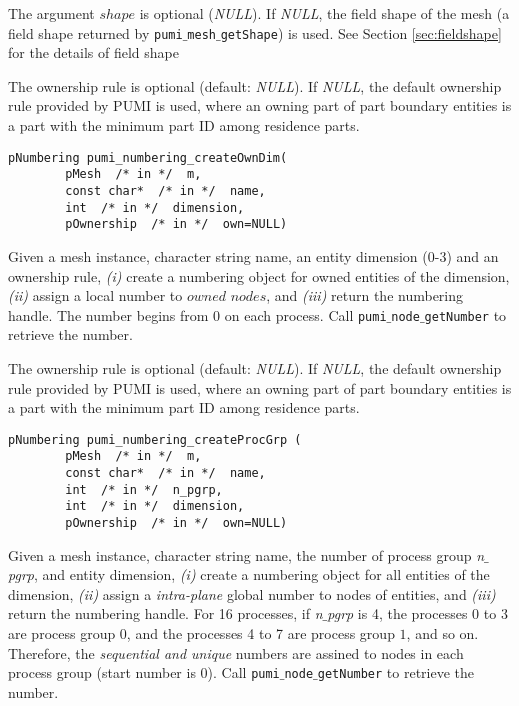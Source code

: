 The argument $shape$ is optional (\emph{NULL}). If \emph{NULL}, the field shape of the mesh 
(a field shape returned by \texttt{pumi$\_$mesh$\_$getShape}) is used. See Section \ref{sec:fieldshape} for the details of field shape

The ownership rule is optional (default: \emph{NULL}). If \emph{NULL}, the default ownership rule provided by PUMI is used, where an owning part of part boundary entities is a part with the minimum part ID among residence parts.

\begin{verbatim}
pNumbering pumi_numbering_createOwnDim(
        pMesh  /* in */  m,
        const char*  /* in */  name,
        int  /* in */  dimension,
        pOwnership  /* in */  own=NULL)
\end{verbatim}\vspace{-.5cm}\hspace{1cm}
Given a mesh instance, character string name, an entity dimension ($0$-$3$) and an ownership rule,  \emph{(i)} create a numbering object for owned entities of the dimension, \emph{(ii)} assign a local number to $owned$ $nodes$, and \emph{(iii)} return the numbering handle. The number begins from 0 on each process. Call \texttt{pumi$\_$node$\_$getNumber} to retrieve the number.

The ownership rule is optional (default: \emph{NULL}). If \emph{NULL}, the default ownership rule provided by PUMI is used, where an owning part of part boundary entities is a part with the minimum part ID among residence parts.

\begin{verbatim}
pNumbering pumi_numbering_createProcGrp (
        pMesh  /* in */  m,
        const char*  /* in */  name,
        int  /* in */  n_pgrp,
        int  /* in */  dimension,
        pOwnership  /* in */  own=NULL)
\end{verbatim}\vspace{-.5cm}\hspace{1cm}
Given a mesh instance, character string name, the number of process group \emph{n}$\_$\emph{pgrp}, and entity dimension, \emph{(i)} create a numbering object for all entities of the dimension, \emph{(ii)} assign a \emph{intra-plane} global number to nodes of entities, and \emph{(iii)} return the numbering handle. For 16 processes, if \emph{n}$\_$\emph{pgrp} is 4, the processes 0 to 3 are process group 0, and  the processes 4 to 7 are process group $1$, and so on. Therefore, the \emph{sequential and unique} numbers are assined to nodes in each process group (start number is 0). Call \texttt{pumi$\_$node$\_$getNumber} to retrieve the number.

